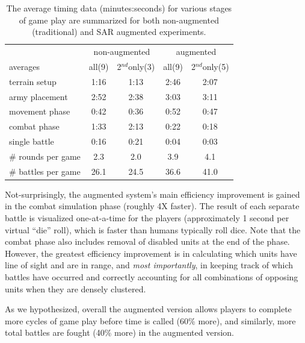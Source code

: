 \documentclass[review]{vgtc}                 %
\begin{document}
\begin{table}[tb]
\begin{center}
\begin{tabular}{@{}l|cc|cc@{}}
               & \multicolumn{2}{c|}{non-augmented} & \multicolumn{2}{c}{augmented} \\
averages       & all(9) & 2$^{nd}$only(3) & all(9) & 2$^{nd}$only(5) \\ \hline
terrain setup  & 1:16    & 1:13         & 2:46    & 2:07         \\
army placement & 2:52    & 2:38         & 3:03    & 3:11 \\ 
movement phase & 0:42    & 0:36         & 0:52    & 0:47 \\
combat phase   & 1:33    & 2:13         & 0:22    & 0:18 \\
single battle  & 0:16    & 0:21         & 0:04    & 0:03 \\ \hline
\# rounds per game & 2.3  & 2.0         & 3.9     & 4.1 \\
\# battles per game & 26.1   & 24.5   &  36.6    & 41.0 
\end{tabular}
\end{center}%
\vspace{-0.15in}
\caption{ The average timing data (minutes:seconds) for various stages
  of game play are summarized for both non-augmented (traditional) and
  SAR augmented experiments.
\label{table:timing_stats}
}
\vspace{-0.1in}
\end{table}

Not-surprisingly, the augmented system's main efficiency improvement
is gained in the combat simulation phase (roughly 4X faster).  The result of each
separate battle is visualized one-at-a-time for the
players (approximately 1 
second per virtual ``die'' roll),
which is faster than humans typically roll dice.  Note that the combat
phase also includes removal of disabled units at the end of the phase.
However, the greatest efficiency improvement is in calculating which
units have line of sight and are in range, and {\em most importantly},
in keeping track of which battles have occurred and correctly
accounting for all combinations of opposing units when they are
densely clustered.

As we hypothesized, overall the augmented version allows players to
complete more cycles of game play before time is called (60\% more),
and similarly, more total battles are fought (40\% more) in the
augmented version.
\end{document}
